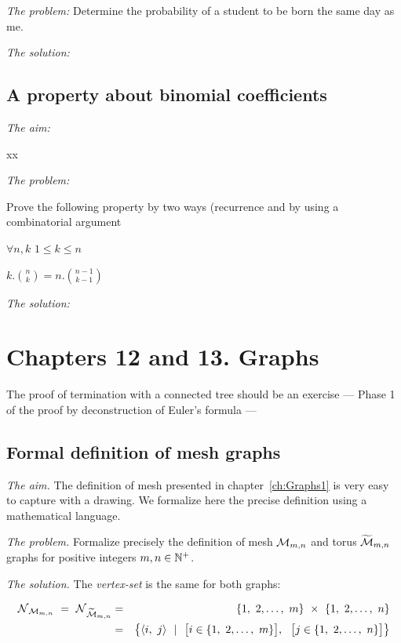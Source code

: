\noindent \textit{The problem:}
Determine the
probability of a student to be born the same day as me.
\medskip

\noindent \textit{The solution:}



\subsection{A property about binomial coefficients}

\noindent \textit{The aim:}

xx
\medskip

\noindent \textit{The problem:}

Prove the following property by two ways (recurrence and by using a combinatorial argument

$\forall n,k$ $1 \leq k \leq n$

$k.{n \choose k} = n.{{n-1} \choose {k-1}}$
\medskip

\noindent \textit{The solution:}





\section{Chapters 12 and 13. Graphs}


{\Arny The proof of termination with a connected tree should be an
  exercise --- Phase 1 of the proof by deconstruction of Euler's
  formula} ---


\subsection{Formal definition of mesh graphs}
\label{Exercice:FormalDefinitionMesh}

\noindent \textit{The aim.}
The definition of mesh presented in chapter~\ref{ch:Graphs1}
is very easy to capture with a drawing.
We formalize here the precise definition using a mathematical language. 
\medskip

\noindent \textit{The problem.}
Formalize precisely the definition of mesh  $\mbox{$\cal M$}_{m,n}$ and torus $\widetilde{\mbox{$\cal M$}}_{m,n}$ graphs
for positive integers $m, n \in \mathbb{N}^+$.
\medskip

\noindent \textit{The solution.}
The  {\it vertex-set} is the same for both graphs:

\begin{eqnarray*}
\n_{\fm_{m,n}} \ = \ \n_{\widetilde{\fm}_{m,n}}
  & = & 
\{1, \ 2, \ldots, \ m\} \ \times \ \{1, \ 2, \ldots, \ n\} \\
  & = & 
\big\{ \langle i, \ j \rangle \ \ | \ \ 
\big[ i \in \{1, \ 2, \ldots, \ m\} \big], \ \
\big[ j \in \{1, \ 2, \ldots, \ n\} \big]
\big\}
\end{eqnarray*}


